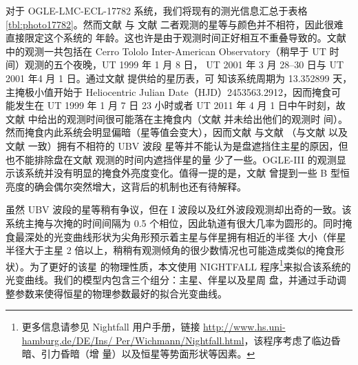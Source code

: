 对于 OGLE-LMC-ECL-17782 系统，我们将现有的测光信息汇总于表格 \ref{tbl:photo17782}。然而文献 
 与 文献  二者观测的星等与颜色并不相符，因此很难直接限定这个系统的
年龄。这也许是由于观测时间正好相互不重叠导致的。文献  中的观测一共包括在 Cerro Tololo 
Inter-American Observatory（稍早于 \textsc{UT} 时间）观测的五个夜晚，\textsc{UT} 1999 年 1 月 8 日，
\textsc{UT} 2001 年 3 月 28--30 日与 UT 2001 年4 月 1 日。通过文献  提供给的星历表，可
知该系统周期为 13.352899 天，主掩极小值开始于 Heliocentric Julian Date（HJD）2453563.2912，因而掩食可
能发生在  \textsc{UT} 1999 年 1 月 7 日 23 小时或者 \textsc{UT} 2011 年 4 月 1 日中午时刻，故文献 
  中给出的观测时间很可能落在主掩食内（文献  并未给出他们的观测时
间）。然而掩食内此系统会明显偏暗（星等值会变大），因而文献  与文献 
 （与文献  以及文献  一致）拥有不相符的 UBV 波段
星等并不能认为是盘遮挡住主星的原因，但也不能排除盘在文献  观测的时间内遮挡伴星的量
少了一些。OGLE-III 的观测显示该系统并没有明显的掩食外亮度变化。值得一提的是，文献  
曾提到一些 B 型恒亮度的确会偶尔突然增大，这背后的机制也还有待解释。


虽然 UBV 波段的星等稍有争议，但在 I 波段以及红外波段观测却出奇的一致。该系统主掩与次掩的时间间隔为 
0.5 个相位，因此轨道有很大几率为圆形的。同时掩食最深处的光变曲线形状为尖角形预示着主星与伴星拥有相近的半径
大小（伴星半径大于主星 2 倍以上，稍稍有观测倾角的很少数情况也可能造成类似的掩食形状）。为了更好的该星
的物理性质，本文使用 \textsc{NIGHTFALL} 程序\footnote{更多信息请参见 Nightfall 用户手册\cite{Wichmann2011}，链接
\url{http://www.hs.uni-hamburg.de/DE/Ins/ Per/Wichmann/Nightfall.html}，该程序考虑了临边昏暗、引力昏暗（增
量）以及恒星等势面形状等因素。}来拟合该系统的光变曲线。我们的模型内包含三个组分：主星、伴星以及星周
盘，并通过手动调整参数来使得恒星的物理参数最好的拟合光变曲线。

